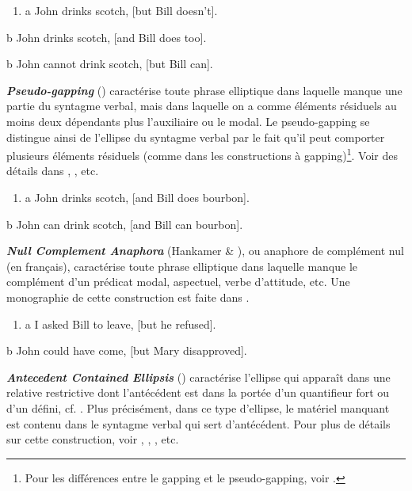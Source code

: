 \begin{enumerate}
\item \label{bkm:Ref306099250}a  John drinks scotch, [but Bill doesn't].


\end{enumerate}
  b  John drinks scotch, [and Bill does too]. 

  b  John cannot drink scotch, [but Bill can].  

\textbf{\textit{Pseudo-gapping}} (\citet{Levin1986}) caractérise toute phrase elliptique dans laquelle manque une partie du syntagme verbal, mais dans laquelle on a comme éléments résiduels au moins deux dépendants plus l'auxiliaire ou le modal. Le pseudo-gapping se distingue ainsi de l'ellipse du syntagme verbal par le fait qu'il peut comporter plusieurs éléments résiduels (comme dans les constructions à gapping)\footnote{Pour les différences entre le gapping et le pseudo-gapping, voir \citet{Johnson2009}.}. Voir des détails dans \citet{Jayaseelan1990}, \citet{Lasnik1999}, etc.


\begin{enumerate}
\item a  John drinks scotch, [and Bill does bourbon]. 


\end{enumerate}
  b  John can drink scotch, [and Bill can bourbon].  

\textbf{\textit{Null Complement Anaphora} }(Hankamer \& \citet{Sag1976}),\textbf{ }ou anaphore de complément nul (en français), caractérise toute phrase elliptique dans laquelle manque le complément d'un prédicat modal, aspectuel, verbe d'attitude, etc. Une monographie de cette construction est faite dans \citet{Depiante2000}.\textbf{ }


\begin{enumerate}
\item a  I asked Bill to leave, [but he refused]. 


\end{enumerate}
  b  John could have come, [but Mary disapproved].  

\textbf{\textit{Antecedent Contained Ellipsis} }(\citet{Bouton1970}) caractérise l'ellipse qui apparaît dans une relative restrictive dont l'antécédent est dans la portée d'un quantifieur fort ou d'un défini, cf. . Plus précisément, dans ce type d'ellipse, le matériel manquant est contenu dans le syntagme verbal qui sert d'antécédent. Pour plus de détails sur cette construction, voir \citet{Baltin1987}, \citet{Kennedy1997}, \citet{Lappin1999}, etc.


